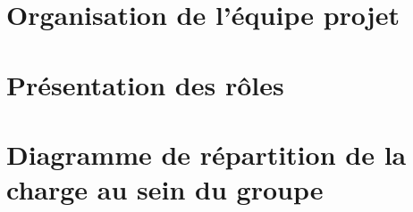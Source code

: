 \section{Organisation de l'équipe projet}

\section{Présentation des rôles}
\section{Diagramme de répartition de la charge au sein du groupe}